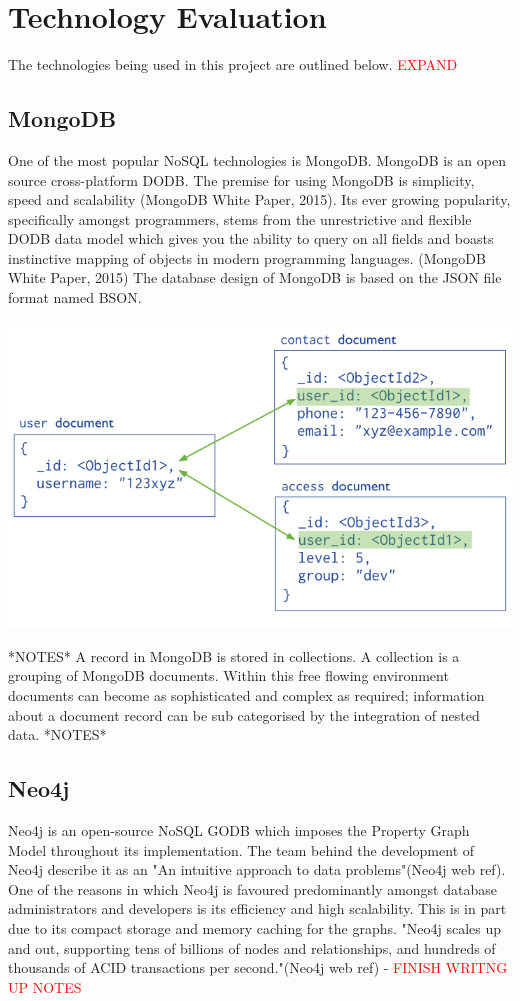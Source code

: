 \chapter{Technology Evaluation}\label{techeval}
The technologies being used in this project are outlined below. \textcolor{red}{EXPAND}
\section{MongoDB}\label{mongo}
One of the most popular NoSQL technologies is MongoDB. MongoDB is an open source cross-platform DODB. The premise for using MongoDB is simplicity, speed and scalability (MongoDB White Paper, 2015). Its ever growing popularity, specifically amongst programmers, stems from the unrestrictive and flexible DODB data model which gives you the ability to query on all fields and boasts instinctive mapping of objects in modern programming languages. (MongoDB White Paper, 2015) The database design of MongoDB is based on the JSON file format named BSON. \begin{center}\includegraphics[width=1\linewidth]{images/mongodbmodel}\end{center}

*NOTES* A record in MongoDB is stored in collections. A collection is a grouping of MongoDB documents.
Within this free flowing environment documents can become as sophisticated and complex as required; information about a document record can be sub categorised by the integration of nested data. *NOTES*

\section{Neo4j}\label{neo}
Neo4j is an open-source NoSQL GODB which imposes the Property Graph Model throughout its implementation. The team behind the development of Neo4j describe it as an "An intuitive approach to data problems"(Neo4j web ref). One of the reasons in which Neo4j is favoured predominantly amongst database administrators and developers is its efficiency and high scalability. This is in part due to its compact storage and memory caching for the graphs. "Neo4j scales up and out, supporting tens of billions of nodes and relationships, and hundreds of thousands of ACID transactions per second."(Neo4j web ref) -\textcolor{red}{ FINISH WRITNG UP NOTES}

